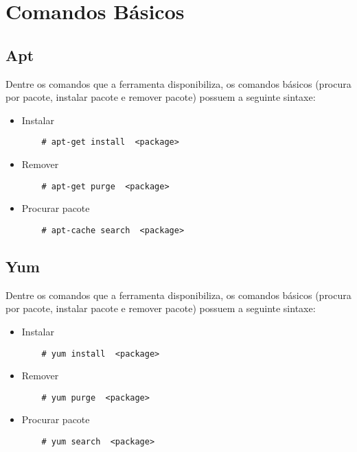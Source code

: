 \section{Comandos Básicos} %
\label{sec:comandos_b_sicos}


\subsection{Apt} %
\label{sub:apt}

Dentre os comandos que a ferramenta disponibiliza, os comandos básicos (procura por pacote, instalar pacote e remover pacote) possuem a seguinte sintaxe:

\begin{itemize}
	\item Instalar
	\begin{lstlisting}
	# apt-get install  <package>
	\end{lstlisting}
	\item Remover
	\begin{lstlisting}
	# apt-get purge  <package>
	\end{lstlisting}
	\item Procurar pacote
	\begin{lstlisting}
	# apt-cache search  <package>
	\end{lstlisting}
\end{itemize}


\subsection{Yum} %
\label{sub:yum}

Dentre os comandos que a ferramenta disponibiliza, os comandos básicos (procura por pacote, instalar pacote e remover pacote) possuem a seguinte sintaxe:

\begin{itemize}
	\item Instalar
	\begin{lstlisting}
	# yum install  <package>
	\end{lstlisting}
	\item Remover
	\begin{lstlisting}
	# yum purge  <package>
	\end{lstlisting}
	\item Procurar pacote
	\begin{lstlisting}
	# yum search  <package>
	\end{lstlisting}
\end{itemize}


